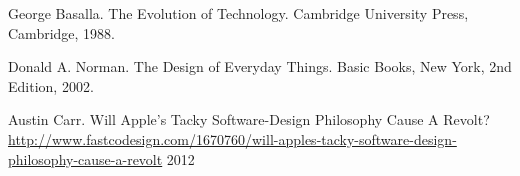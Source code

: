 \documentclass[12pt onesided letterpaper]{report}
\begin{document}
\begin{thebibliography}

  George Basalla.
  The Evolution of Technology.
  Cambridge University Press, Cambridge,
  1988.
  
  Donald A. Norman.
  The Design of Everyday Things.
  Basic Books, New York,
  2nd Edition,
  2002.
  
   Austin Carr.
   Will Apple’s Tacky Software-Design Philosophy Cause A Revolt?
   \url{http://www.fastcodesign.com/1670760/will-apples-tacky-software-design-philosophy-cause-a-revolt}
   2012
   

\end{thebibliography}
\end{document}
